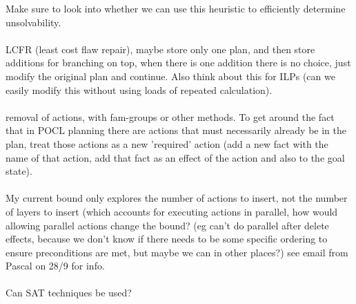 \documentclass[runningheads]{llncs}
\begin{document}
Make sure to look into whether we can use this heuristic to efficiently determine unsolvability.
\\\\
LCFR (least cost flaw repair), maybe store only one plan, and then store additions for branching on top, when there is one addition there is no choice, just modify the original plan and continue. Also think about this for ILPs (can we easily modify this without using loads of repeated calculation).
\\\\
removal of actions, with fam-groups or other methods. To get around the fact that in POCL planning there are actions that must necessarily already be in the plan, treat those actions as a new 'required' action (add a new fact with the name of that action, add that fact as an effect of the action and also to the goal state).\\\\
My current bound only explores the number of actions to insert, not the number of layers to insert (which accounts for executing actions in parallel, how would allowing parallel actions change the bound? (eg can't do parallel after delete effects, because we don't know if there needs to be some specific ordering to ensure preconditions are met, but maybe we can in other places?) see email from Pascal on 28/9 for info.\\\\
Can SAT techniques be used?



\end{document}
